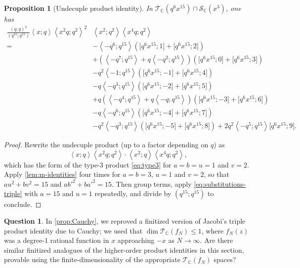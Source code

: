 \documentclass[reqno,11pt]{amsart}
\newtheorem{proposition}[theorem]{Proposition}
\theoremstyle{definition}
\newtheorem{question}{Question}
\theoremstyle{remark}
\numberwithin{equation}{section}
\newcommand{\C}{\mathbb{C}}
\newcommand{\mT}{\mathcal{T}}
\newcommand{\mS}{\mathcal{S}}
\newcommand{\la}{\left\langle}
\newcommand{\ra}{\right\rangle}
\newcommand{\vect}[2]{\big[{#1};{#2}\big]}
\begin{document}
\begin{proposition}[Undecuple product identity] \label{prop:undecuple}
In $\mT_\C\left(q^6 x^{15} \right) \cap \mS_\C\left(x^3 \right)$, one has
\[
\begin{aligned}
    \frac{(q; q)^2}{\left(q^{15}; q^{15}\right)}\la x; q \ra \la x^2q; q^2 \ra^2 &\la x^2; q^2 \ra \la x^4q; q^2 \ra
    \\
    =
    &-\la -q^6; q^{15} \ra \left(\vect{q^6 x^{15}}{1} + \vect{q^6 x^{15}}{2}\right) \\
    &+
    \left(\la -q^7; q^{15} \ra + q\la -q^2; q^{15} \ra\right) \left(\vect{q^6 x^{15}}{0} + \vect{q^6 x^{15}}{3}\right) \\
    &- q^2 \la -1; q^{15} \ra\left(\vect{q^6 x^{15}}{-1} + \vect{q^6 x^{15}}{4}\right) \\
    &- q \la -q^3; q^{15} \ra \left(\vect{q^6 x^{15}}{-2} + \vect{q^6 x^{15}}{5}\right) \\
    &+ q\left(\la -q^4; q^{15}\ra + q\la -q; q^{15} \ra\right) \left(\vect{q^6 x^{15}}{-3} + \vect{q^6 x^{15}}{6}\right) \\
    &- q\la -q^6; q^{15} \ra \left(\vect{q^6 x^{15}}{-4} + \vect{q^6 x^{15}}{7}\right) \\
    &- q^2\la -q^3; q^{15} \ra \left(\vect{q^6 x^{15}}{-5} + \vect{q^6 x^{15}}{8}\right) + 2q^2\la -q^5; q^{15} \ra\vect{q^6 x^{15}}{9}.
\end{aligned}
\]
\end{proposition}
\begin{proof}
Rewrite the undecuple product (up to a factor depending on $q$) as
\[
    \la x; q \ra \la x^2q ; q^2 \ra 
    \cdot \la x^2; q \ra \la x^4 q; q^2 \ra,
\]
which has the form of the type-3 product \cref{eq:type3} for $a = b = u = 1$ and $v = 2$. Apply \cref{lem:m-identities} four times for $a = b = 3$, $u = 1$ and $v = 2$, so that $au^2 + bv^2 = 15$ and $ab'^2 + ba'^2 = 15$. Then group terms, apply \cref{eq:substitutions-triple} with $a = 15$ and $u = 1$ repeatedly, and divide by $\left(q^{15}; q^{15}\right)$ to conclude.
\end{proof}

\begin{question}\label{qtn:finitized}
In \cref{prop:Cauchy}, we reproved a finitized version of Jacobi's triple product identity due to Cauchy; we used that $\dim \mT_\C(f_N) \le 1$, where $f_N(z)$ was a degree-1 rational function in $x$ approaching $-x$ as $N \to \infty$. Are there similar finitized analogues of the higher-order product identities in this section, provable using the finite-dimensionality of the appropriate $\mT_\C(f_N)$ spaces?
\end{question}
\end{document}

